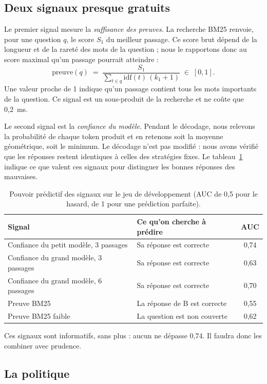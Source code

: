 \documentclass[11pt,a4paper]{article}
\begin{document}
\subsection{Deux signaux presque gratuits}

Le premier signal mesure la \emph{suffisance des preuves}. La recherche BM25 renvoie, pour une question
$q$, le score $S_1$ du meilleur passage. Ce score brut dépend de la longueur et de la rareté des mots
de la question ; nous le rapportons donc au score maximal qu'un passage pourrait atteindre :
\[
\text{preuve}(q) \;=\; \frac{S_1}{\sum_{t \in q} \mathrm{idf}(t)\,(k_1+1)} \;\in\; [0,1].
\]
Une valeur proche de 1 indique qu'un passage contient tous les mots importants de la question. Ce signal
est un sous-produit de la recherche et ne coûte que 0,2~ms.

Le second signal est la \emph{confiance du modèle}. Pendant le décodage, nous relevons la probabilité de
chaque token produit et en retenons soit la moyenne géométrique, soit le minimum. Le décodage n'est pas
modifié : nous avons vérifié que les réponses restent identiques à celles des stratégies fixes. Le
tableau~\ref{tab:auc} indique ce que valent ces signaux pour distinguer les bonnes réponses des
mauvaises.

\begin{table}[H]
\centering\small
\begin{tabular}{l l c}
\toprule
\textbf{Signal} & \textbf{Ce qu'on cherche à prédire} & \textbf{AUC} \\
\midrule
Confiance du petit modèle, 3 passages & Sa réponse est correcte & 0,74 \\
Confiance du grand modèle, 3 passages & Sa réponse est correcte & 0,63 \\
Confiance du grand modèle, 6 passages & Sa réponse est correcte & 0,70 \\
Preuve BM25 & La réponse de B est correcte & 0,55 \\
Preuve BM25 faible & La question est non couverte & 0,62 \\
\bottomrule
\end{tabular}
\caption{Pouvoir prédictif des signaux sur le jeu de développement (AUC de 0,5 pour le hasard, de 1
pour une prédiction parfaite).}
\label{tab:auc}
\end{table}

Ces signaux sont informatifs, sans plus : aucun ne dépasse 0,74. Il faudra donc les combiner avec
prudence.

\subsection{La politique}
\end{document}
